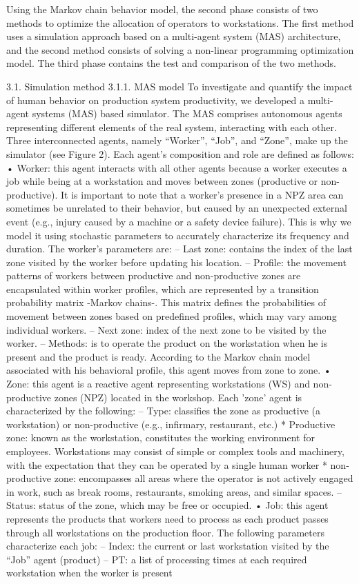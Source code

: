 Using the Markov chain behavior model, the second phase consists of two methods to optimize the allocation of operators to workstations. The first method uses a simulation approach based on a multi-agent system (MAS) architecture, and the second method consists of solving a non-linear programming optimization model. The third phase contains the test and comparison of the two methods.
 
3.1.	Simulation method
3.1.1.	MAS model
To investigate and quantify the impact of human behavior on production system productivity, we developed a multi-agent systems (MAS) based simulator. The MAS comprises autonomous agents representing different elements of the real system, interacting with each other. Three interconnected agents, namely “Worker”, “Job”, and “Zone”, make up the simulator (see Figure 2).
Each agent’s composition and role are defined as follows:
• Worker: this agent interacts with all other agents because a worker executes a job while being at a workstation and moves between zones (productive or non-productive). It is important to note that a worker’s presence in a NPZ area can sometimes be unrelated to their behavior, but caused by an unexpected external event (e.g., injury caused by a machine or a safety device failure). This is why we model it using stochastic parameters to accurately characterize its frequency and duration. The worker’s parameters are:
–	Last zone: contains the index of the last zone visited by the worker before updating his
location.
–	Profile: the movement patterns of workers between productive and non-productive zones are encapsulated within worker profiles, which are represented by a transition probability matrix -Markov chains-. This matrix defines the probabilities of movement between zones based on predefined profiles, which may vary among individual workers.
–	Next zone: index of the next zone to be visited by the worker.
–	Methods: is to operate the product on the workstation when he is present and the product is ready. According to the Markov chain model associated with his behavioral profile, this agent moves from zone to zone.
•	Zone: this agent is a reactive agent representing workstations (WS) and non-productive zones (NPZ) located in the workshop. Each ’zone’ agent is characterized by the following:
– Type: classifies the zone as productive (a workstation) or non-productive (e.g., infirmary, restaurant, etc.)
*	Productive zone: known as the workstation, constitutes the working environment for employees. Workstations may consist of simple or complex tools and machinery, with the expectation that they can be operated by a single human worker
*	non-productive zone: encompasses all areas where the operator is not actively engaged in work, such as break rooms, restaurants, smoking areas, and similar
spaces.
– Status: status of the zone, which may be free or occupied.
•	Job: this agent represents the products that workers need to process as each product passes through all workstations on the production floor. The following parameters characterize each job:
–	Index: the current or last workstation visited by the “Job” agent (product)
–	PT: a list of processing times at each required workstation when the worker is present
 
